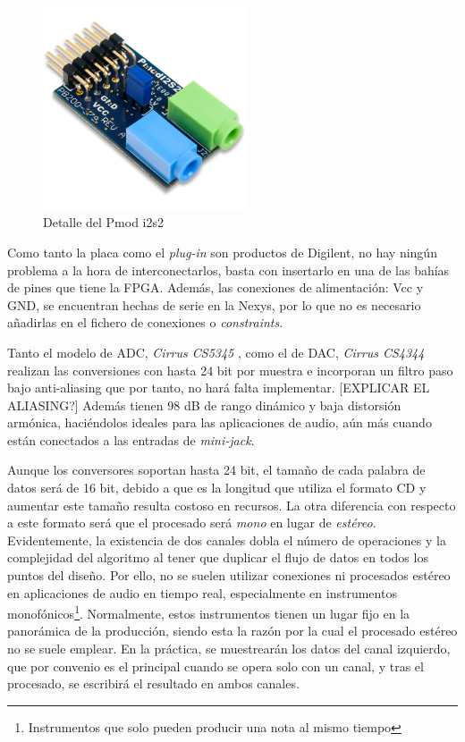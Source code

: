 \begin{figure}[!ht]
\begin{center}
\includegraphics[width=6cm]{img/pmod.png}
\caption{\label{fig:pmod}Detalle del Pmod i2s2}
\end{center}
\end{figure}

Como tanto la placa como el \emph{plug-in} son productos de Digilent, no hay ningún problema a la hora de interconectarlos, basta con insertarlo en una de las bahías de pines que tiene la FPGA. Además, las conexiones de alimentación: Vcc y GND, se encuentran hechas de serie en la Nexys, por lo que no es necesario añadirlas en el fichero de conexiones o \emph{constraints}.

Tanto el modelo de ADC, \emph{Cirrus CS5345} \cite{adcdata}, como el de DAC, \emph{Cirrus CS4344} \cite{dacdata} realizan las conversiones con hasta 24 bit por muestra e incorporan un filtro paso bajo anti-aliasing que por tanto, no hará falta implementar. [EXPLICAR EL ALIASING?] Además tienen 98 dB de rango dinámico y baja distorsión armónica, haciéndolos ideales para las aplicaciones de audio, aún más cuando están conectados a  las entradas de \emph{mini-jack}.

Aunque los conversores soportan hasta 24 bit, el tamaño de cada palabra de datos será de 16 bit, debido a que es la longitud que utiliza el formato CD y aumentar este tamaño resulta costoso en recursos. La otra diferencia con respecto a este formato será que el procesado será \emph{mono} en lugar de \emph{estéreo}. Evidentemente, la existencia de dos canales dobla el número de operaciones y la complejidad del algoritmo al tener que duplicar el flujo de datos en todos los puntos del diseño. Por ello, no se suelen utilizar conexiones ni procesados estéreo en aplicaciones de audio en tiempo real, especialmente en instrumentos monofónicos\footnote{Instrumentos que solo pueden producir una nota al mismo tiempo}. Normalmente, estos instrumentos tienen un lugar fijo en la panorámica de la producción, siendo esta la razón por la cual el procesado estéreo no se suele emplear. En la práctica, se muestrearán los datos del canal izquierdo, que por convenio es el principal cuando se opera solo con un canal, y tras el procesado, se escribirá el resultado en ambos canales.

